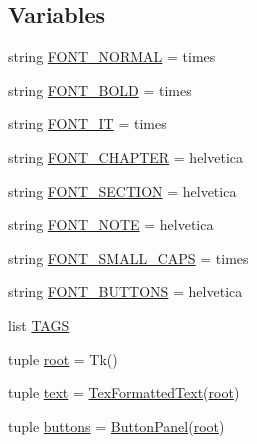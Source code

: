 \subsection*{Variables}
\begin{DoxyCompactItemize}
\item 
string \hyperlink{namespacetex__editor_1_1text_ae4abaacad25df0490b14871b84306412}{F\+O\+N\+T\+\_\+\+N\+O\+R\+M\+A\+L} = \textquotesingle{}times\textquotesingle{}
\item 
string \hyperlink{namespacetex__editor_1_1text_a0d36f58bd021fa23bda70001db82820f}{F\+O\+N\+T\+\_\+\+B\+O\+L\+D} = \textquotesingle{}times\textquotesingle{}
\item 
string \hyperlink{namespacetex__editor_1_1text_ad2ecd423c254410d6da8371b50098d2e}{F\+O\+N\+T\+\_\+\+I\+T} = \textquotesingle{}times\textquotesingle{}
\item 
string \hyperlink{namespacetex__editor_1_1text_a239169e2c6ed1d9f9cb2e4ff1ec17977}{F\+O\+N\+T\+\_\+\+C\+H\+A\+P\+T\+E\+R} = \textquotesingle{}helvetica\textquotesingle{}
\item 
string \hyperlink{namespacetex__editor_1_1text_a6e4953aca7ce841dee2735d37705d653}{F\+O\+N\+T\+\_\+\+S\+E\+C\+T\+I\+O\+N} = \textquotesingle{}helvetica\textquotesingle{}
\item 
string \hyperlink{namespacetex__editor_1_1text_a6ad5c54bf2484d9199d1b72c81e17ed7}{F\+O\+N\+T\+\_\+\+N\+O\+T\+E} = \textquotesingle{}helvetica\textquotesingle{}
\item 
string \hyperlink{namespacetex__editor_1_1text_ae74d39eb8742994b41f56541bc8bae6c}{F\+O\+N\+T\+\_\+\+S\+M\+A\+L\+L\+\_\+\+C\+A\+P\+S} = \textquotesingle{}times\textquotesingle{}
\item 
string \hyperlink{namespacetex__editor_1_1text_a092a6d860a959ef17dfa70c0c374bd44}{F\+O\+N\+T\+\_\+\+B\+U\+T\+T\+O\+N\+S} = \textquotesingle{}helvetica\textquotesingle{}
\item 
list \hyperlink{namespacetex__editor_1_1text_ab9d862754bd7eda7e4b7b806d4d3e04e}{T\+A\+G\+S}
\item 
tuple \hyperlink{namespacetex__editor_1_1text_ae1f9e270c1a1a3a86e7eb78754c66079}{root} = Tk()
\item 
tuple \hyperlink{namespacetex__editor_1_1text_a9ea0b7df59ef9eead26c31eb11278788}{text} = \hyperlink{classtex__editor_1_1text_1_1_tex_formatted_text}{Tex\+Formatted\+Text}(\hyperlink{namespacetex__editor_1_1text_ae1f9e270c1a1a3a86e7eb78754c66079}{root})
\item 
tuple \hyperlink{namespacetex__editor_1_1text_af96963df6d273be573113add17189a07}{buttons} = \hyperlink{classtex__editor_1_1text_1_1_button_panel}{Button\+Panel}(\hyperlink{namespacetex__editor_1_1text_ae1f9e270c1a1a3a86e7eb78754c66079}{root})
\end{DoxyCompactItemize}


